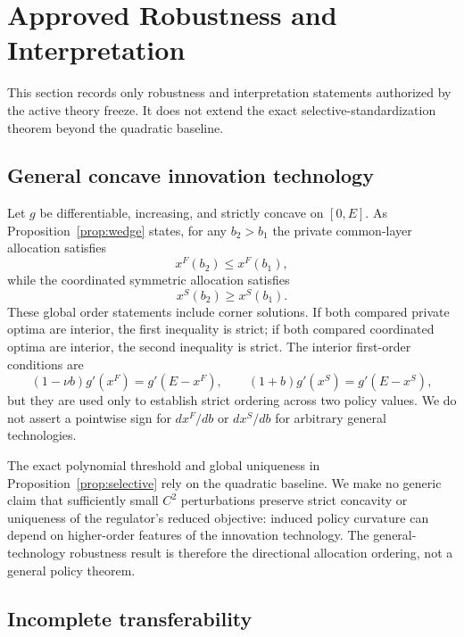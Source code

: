 \section{Approved Robustness and Interpretation}

This section records only robustness and interpretation statements authorized by the active theory freeze. It does not extend the exact selective-standardization theorem beyond the quadratic baseline.

\subsection{General concave innovation technology}

Let $g$ be differentiable, increasing, and strictly concave on $[0,E]$. As Proposition~\ref{prop:wedge} states, for any $b_2>b_1$ the private common-layer allocation satisfies
\begin{equation}
 x^F(b_2)\leq x^F(b_1),
\end{equation}
while the coordinated symmetric allocation satisfies
\begin{equation}
 x^S(b_2)\geq x^S(b_1).
\end{equation}
These global order statements include corner solutions. If both compared private optima are interior, the first inequality is strict; if both compared coordinated optima are interior, the second inequality is strict. The interior first-order conditions are
\begin{equation}
 (1-\nu b)g'(x^F)=g'(E-x^F),
 \qquad
 (1+b)g'(x^S)=g'(E-x^S),
\end{equation}
but they are used only to establish strict ordering across two policy values. We do not assert a pointwise sign for $dx^F/db$ or $dx^S/db$ for arbitrary general technologies.

The exact polynomial threshold and global uniqueness in Proposition~\ref{prop:selective} rely on the quadratic baseline. We make no generic claim that sufficiently small $C^2$ perturbations preserve strict concavity or uniqueness of the regulator's reduced objective: induced policy curvature can depend on higher-order features of the innovation technology. The general-technology robustness result is therefore the directional allocation ordering, not a general policy theorem.

\subsection{Incomplete transferability}

